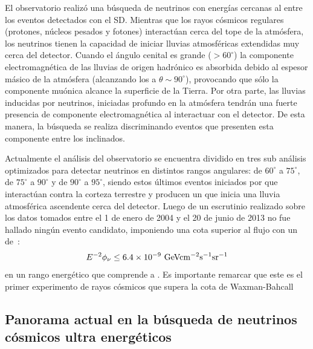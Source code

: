 	El observatorio realiz\'o una b\'usqueda de neutrinos con energ\'ias cercanas al  entre los eventos detectados con el SD.
	Mientras que los rayos c\'osmicos regulares (protones, n\'ucleos pesados y fotones) interact\'uan cerca del tope de la atm\'osfera, los neutrinos tienen la capacidad de iniciar lluvias atmosf\'ericas extendidas muy cerca del detector. 
	Cuando el \'angulo cenital es grande ($>60^\circ$) la componente electromagn\'etica de las lluvias de origen hadr\'onico es absorbida debido al espesor m\'asico de la atm\'osfera (alcanzando los  a $\theta\sim90^\circ$), provocando que s\'olo la componente mu\'onica alcance la superficie de la Tierra.
	Por otra parte, las lluvias inducidas por neutrinos, iniciadas profundo en la atm\'osfera tendr\'an una fuerte presencia de componente electromagn\'etica al interactuar con el detector.
	De esta manera, la b\'usqueda se realiza discriminando eventos que presenten esta componente entre los inclinados. 
	
	Actualmente el an\'alisis del observatorio se encuentra dividido en tres sub an\'alisis optimizados para detectar neutrinos en distintos rangos angulares: de $60^\circ$ a $75^\circ$, de $75^\circ$ a $90^\circ$ y de $90^\circ$ a $95^\circ$, siendo estos \'ultimos eventos iniciados por \nutau{} que interact\'uan contra la corteza terrestre y producen un \tauon{} que inicia una lluvia atmosf\'erica ascendente cerca del detector.
	Luego de un escrutinio realizado sobre los datos tomados entre el 1 de enero de 2004 y el 20 de junio de 2013 no fue hallado ning\'un evento candidato, imponiendo una cota superior al flujo con un  de~\cite{Aab:2015kma}:
	\begin{equation}
	 E^{-2}\phi_\nu \leq 6.4\times10^{-9}{\rm\ GeVcm^{-2}s^{-1}sr^{-1}}
	\end{equation}
	en un rango energ\'etico que comprende  a .
	Es importante remarcar que este es el primer experimento de rayos c\'osmicos que supera la cota de Waxman-Bahcall
	\fi 


	
	\subsection{Panorama actual en la b\'usqueda de neutrinos c\'osmicos ultra energ\'eticos}
	
